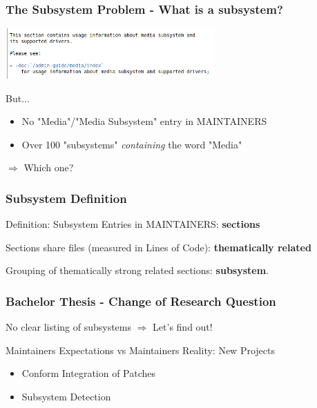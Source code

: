 \documentclass{beamer}
\begin{document}
	\begin{frame}
	\frametitle{The Subsystem Problem - What is a subsystem?}
	\begin{center}
     	\includegraphics[width=0.6\textwidth]{pics/Media_subsystem.png}
	\end{center}

	\begin{block}{But... }
		\begin{itemize}
		\item No "Media"/"Media Subsystem" entry in MAINTAINERS
		\item Over 100 "subsystems" \textit{containing} the word "Media"
		\end{itemize}
	\end{block}
	\begin{center}
	$\Rightarrow$ Which one?
	\end{center}
	\end{frame}

	\begin{frame} 
	\frametitle{Subsystem Definition}
		\begin{block}{Definition: Subsystem}
			Entries in MAINTAINERS: \textbf{sections}

			Sections share files (measured in Lines of Code): \textbf{thematically related}

			Grouping of thematically strong related sections: \textbf{subsystem}.

		\end{block}
	\end{frame}

	\begin{frame}
	\frametitle{Bachelor Thesis - Change of Research Question}
		\begin{block}{No clear listing of subsystems}
			$\Rightarrow$ Let's find out!
		\end{block}



		\begin{block}{Maintainers Expectations vs Maintainers Reality: New Projects}
			\begin{itemize}
				\item Conform Integration of Patches
				\item Subsystem Detection
			\end{itemize}
		\end{block}
	\end{frame}
\end{document}
